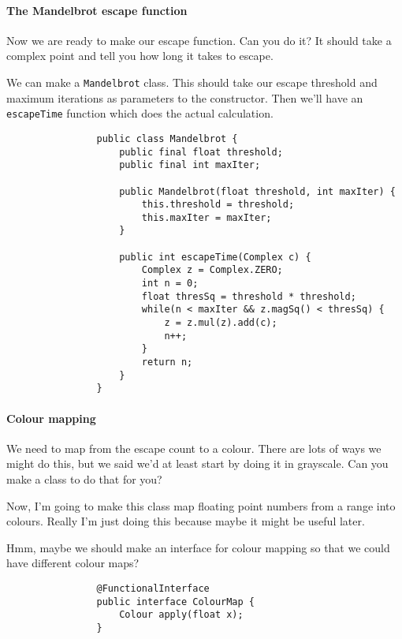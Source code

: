 \documentclass{article}
\begin{document}
        \paragraph{The Mandelbrot escape function}
            Now we are ready to make our escape function. Can you do it? It should take a complex point and tell you how long it takes to
            escape.
            
            We can make a \texttt{Mandelbrot} class. This should take our escape threshold and maximum iterations as parameters to
            the constructor. Then we'll have an \texttt{escapeTime} function which does the actual calculation.
            
            \begin{verbatim}
                public class Mandelbrot {
                    public final float threshold;
                    public final int maxIter;
                    
                    public Mandelbrot(float threshold, int maxIter) {
                        this.threshold = threshold;
                        this.maxIter = maxIter;
                    }
            
                    public int escapeTime(Complex c) {
                        Complex z = Complex.ZERO;
                        int n = 0;
                        float thresSq = threshold * threshold;
                        while(n < maxIter && z.magSq() < thresSq) {
                            z = z.mul(z).add(c); 
                            n++;
                        }
                        return n;
                    }
                }
            \end{verbatim}
            
        \paragraph{Colour mapping}
            We need to map from the escape count to a colour. There are lots of ways we might do this, but we said we'd at least start by
            doing it in grayscale.  Can you make a class to do that for you?
            
            Now, I'm going to make this class map floating point numbers from a range into colours. Really I'm just doing this because
            maybe it might be useful later. 
            
            Hmm, maybe we should make an interface for colour mapping so that we could have different colour maps?
            \begin{verbatim}
                @FunctionalInterface
                public interface ColourMap {
                    Colour apply(float x);
                }
            \end{verbatim}
            
\end{document}
